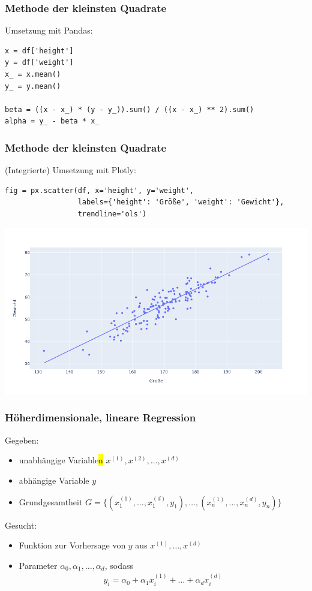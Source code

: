
\begin{frame}[fragile]
\frametitle{Methode der kleinsten Quadrate}

Umsetzung mit Pandas:
\begin{verbatim}
x = df['height']
y = df['weight']
x_ = x.mean()
y_ = y.mean()

beta = ((x - x_) * (y - y_)).sum() / ((x - x_) ** 2).sum()
alpha = y_ - beta * x_
\end{verbatim}

\end{frame}


\begin{frame}[fragile]
\frametitle{Methode der kleinsten Quadrate}

(Integrierte) Umsetzung mit Plotly:
\begin{verbatim}
fig = px.scatter(df, x='height', y='weight',
                 labels={'height': 'Größe', 'weight': 'Gewicht'},
                 trendline='ols')
\end{verbatim}

\begin{center}
\includegraphics[width=0.6\linewidth]{fig7/artifical-ols.png}
\end{center}

\end{frame}


\begin{frame}
\frametitle{Höherdimensionale, lineare Regression}

Gegeben:
\begin{itemize}
	\item unabhängige Variable\hl{n} $x^{(1)}, x^{(2)}, \dots, x^{(d)}$
	\item abhängige Variable $y$
	\item Grundgesamtheit $G = \{(x^{(1)}_1, \dots, x^{(d)}_1, y_1), \dots, (x^{(1)}_n, \dots, x^{(d)}_n, y_n)\}$
\end{itemize}

Gesucht:
\begin{itemize}
	\item Funktion zur Vorhersage von $y$ aus $x^{(1)}, \dots, x^{(d)}$
	\item Parameter $\alpha_0, \alpha_1, \dots, \alpha_d$, sodass \begin{align*}
		y_i = \alpha_0 + \alpha_1 x^{(1)}_i + \dots + \alpha_d x^{(d)}_i
	\end{align*}
\end{itemize}

\end{frame}

